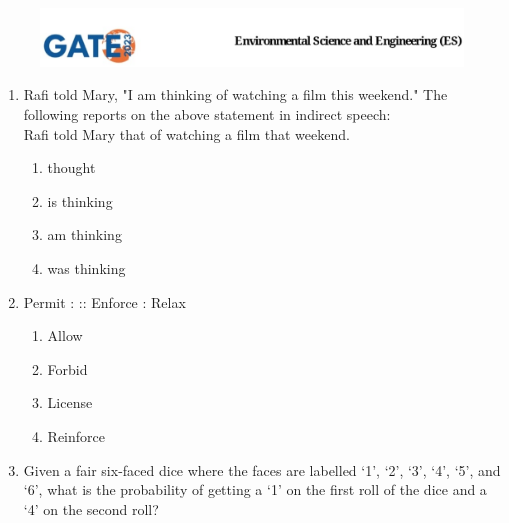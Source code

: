 \documentclass[journal,12pt,onecolumn]{IEEEtran}
\theoremstyle{remark}
\begin{document}
\begin{figure}
    
    \includegraphics[width=1\linewidth]{figs/latex.jpg}
    
\end{figure}
\begin{enumerate}[start=1, label={Q\arabic*.}]
\item Rafi told Mary, "I am thinking of watching a film this weekend." 
The following reports on the above statement in indirect speech:\\ Rafi told Mary that 
\underline{\hspace{2cm}} of watching a film that weekend.
\begin{enumerate}[label=(\Alph*)]
\item thought
\item is thinking
\item am thinking
\item was thinking
\end{enumerate}
\hfill{}
\item Permit : \underline{\hspace{2cm}} :: Enforce : Relax \\
\begin{enumerate}[label=(\Alph*)]
\item Allow
\item Forbid
\item License
\item Reinforce
\end{enumerate}
\hfill{}
\item Given a fair six-faced dice where the faces are labelled `1', `2', `3', `4', `5', and `6', what is the probability of getting a `1' on the first roll of the dice and a `4' on the second roll?
\begin{enumerate}[label=(\Alph*)]
\end{enumerate}

\end{enumerate}
\end{document}
